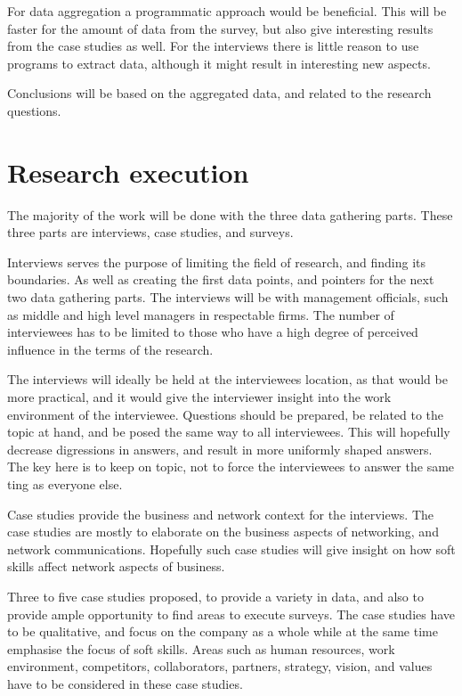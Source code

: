 \documentclass[12pt,journal,compsoc]{IEEEtran}
\begin{document}
For data aggregation a programmatic approach would be beneficial. This will be
faster for the amount of data from the survey, but also give interesting
results from the case studies as well. For the interviews there is little
reason to use programs to extract data, although it might result in interesting
new aspects.

Conclusions will be based on the aggregated data, and related to the research
questions. 

\section{Research execution}

The majority of the work will be done with the three data gathering parts.
These three parts are interviews, case studies, and surveys.

Interviews serves the purpose of limiting the field of research, and finding
its boundaries. As well as creating the first data points, and pointers for the
next two data gathering parts. The interviews will be with management
officials, such as middle and high level managers in respectable firms. The
number of interviewees has to be limited to those who have a high degree of
perceived influence in the terms of the research.

The interviews will ideally be held at the interviewees location, as that would
be more practical, and it would give the interviewer insight into the work
environment of the interviewee. Questions should be prepared, be related to the
topic at hand, and be posed the same way to all interviewees. This will
hopefully decrease digressions in answers, and result in more uniformly shaped
answers. The key here is to keep on topic, not to force the interviewees to
answer the same ting as everyone else. 

Case studies provide the business and network context for the interviews. The
case studies are mostly to elaborate on the business aspects of networking, and
network communications. Hopefully such case studies will give insight on how
soft skills affect network aspects of business.      

Three to five case studies proposed, to provide a variety in data, and also to
provide ample opportunity to find areas to execute surveys. The case studies
have to be qualitative, and focus on the company as a whole while at the same
time emphasise the focus of soft skills. Areas such as human resources, work
environment, competitors, collaborators, partners, strategy, vision, and values
have to be considered in these case studies. 
\end{document}
